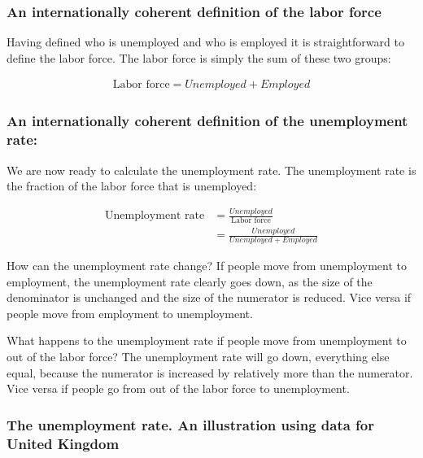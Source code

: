 \documentclass[]{book}
\begin{document}
\hypertarget{an-internationally-coherent-definition-of-the-labor-force}{%
\subsubsection{An internationally coherent definition of the labor force}\label{an-internationally-coherent-definition-of-the-labor-force}}

Having defined who is unemployed and who is employed it is straightforward to define the labor force. The labor force is simply the sum of these two groups:

\begin{align}
  \text{Labor force}=Unemployed+Employed
\end{align}

\hypertarget{an-internationally-coherent-definition-of-the-unemployment-rate}{%
\subsubsection{An internationally coherent definition of the unemployment rate:}\label{an-internationally-coherent-definition-of-the-unemployment-rate}}

We are now ready to calculate the unemployment rate. The unemployment rate is the fraction of the labor force that is unemployed:

\begin{align}
  \text{Unemployment rate}&=\frac{Unemployed}{\text{Labor force}}\nonumber\\
  &=\frac{Unemployed}{Unemployed+Employed}
\end{align}

How can the unemployment rate change? If people move from unemployment to employment, the unemployment rate clearly goes down, as the size of the denominator is unchanged and the size of the numerator is reduced. Vice versa if people move from employment to unemployment.

What happens to the unemployment rate if people move from unemployment to out of the labor force? The unemployment rate will go down, everything else equal, because the numerator is increased by relatively more than the numerator. Vice versa if people go from out of the labor force to unemployment.

\hypertarget{the-unemployment-rate.-an-illustration-using-data-for-united-kingdom}{%
\subsubsection{The unemployment rate. An illustration using data for United Kingdom}\label{the-unemployment-rate.-an-illustration-using-data-for-united-kingdom}}
\end{document}
